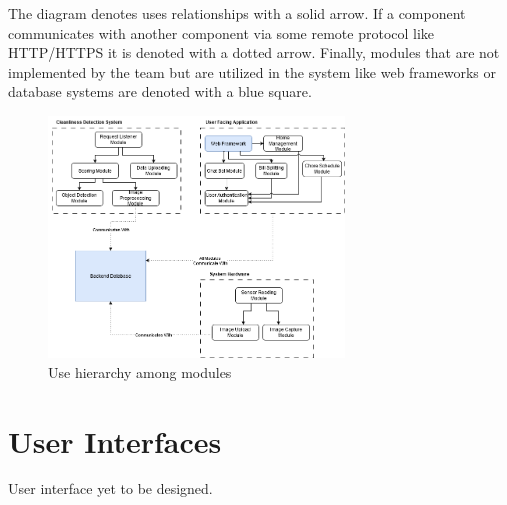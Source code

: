 \documentclass[12pt, titlepage]{article}
\begin{document}
The diagram denotes uses relationships with a solid arrow. If a component  communicates with another component via some remote protocol like HTTP/HTTPS it is denoted with a dotted arrow. Finally, modules that are not implemented by the team but are utilized in the system like web frameworks or database systems are denoted with a blue square.


\begin{figure}[H]
\centering
\includegraphics[width=0.7\textwidth]{UsesHierarchy.png}
\caption{Use hierarchy among modules}
\label{FigUH}
\end{figure}




\section{User Interfaces}
User interface yet to be designed.

\end{document}
